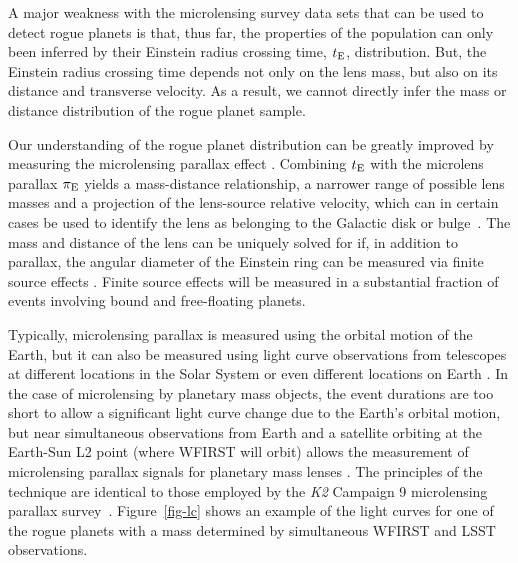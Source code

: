 A major weakness with the microlensing survey data sets that can be used to detect rogue planets is that, thus far, the properties
of the population can only been inferred by their Einstein radius
crossing time, $t_{\rm E}$, distribution. But, the Einstein radius crossing
time depends not only on the lens mass, but also on its distance and
transverse velocity. As a result, we cannot directly infer the mass or distance
distribution of the rogue planet sample.

Our understanding of the rogue planet distribution can be greatly improved
by measuring the microlensing parallax effect \citep{1992ApJ...392..442G,1995ApJ...454L.125A}.
Combining $t_{\rm E}$ with the microlens parallax $\pi_{\rm E}$ yields a mass-distance relationship, a narrower range of possible lens masses and a projection of the lens-source relative velocity, which can in certain cases be used to identify the lens as belonging to the Galactic disk or bulge~\citep{2015ApJ...802...76Y}. The mass and distance of the lens can be uniquely solved for if, in addition to parallax, the angular diameter of the Einstein ring can be measured via finite source effects \citep{1994ApJ...424L..21N}. Finite source effects will be measured in a substantial fraction of events involving bound and free-floating planets.

Typically, microlensing parallax
is measured using the orbital motion of the Earth, but it can also be
measured using light curve observations from telescopes at different locations
in the Solar System \citep{2007ApJ...664..862D,2015ApJ...804...20C} or
even different locations on Earth \citep{2009ApJ...698L.147G}. In the
case of microlensing by planetary mass objects, the event durations are
too short to allow a significant light curve change due to the Earth's
orbital motion, but near simultaneous observations from Earth and a
satellite orbiting at the Earth-Sun L2 point (where WFIRST will orbit) allows the measurement of microlensing parallax signals for planetary mass
lenses \citep{2003ApJ...591L..53G}. The principles of the technique are identical to those employed by the {\it K2} Campaign 9 microlensing parallax survey~\citep{2016PASP..128l4401H,2016AJ....152...96H,2017AJ....153..161P}.
Figure~\ref{fig-lc} shows an example of the light curves for one of the
rogue planets with a mass determined by simultaneous WFIRST and LSST
observations.

